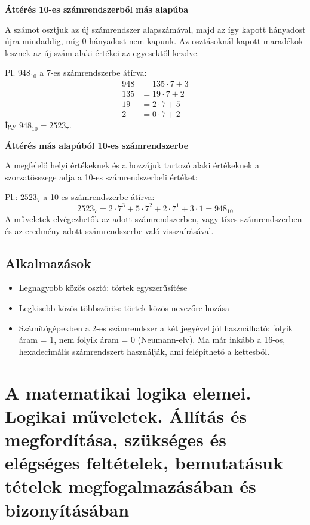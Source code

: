\documentclass[12pt,a4paper]{article}
\begin{document}
\vspace{30px}
\textbf{Áttérés 10-es számrendszerből más alapúba}

A számot osztjuk az új számrendszer alapszámával, majd az így kapott hányadost újra mindaddig, míg 0 hányadost nem kapunk. Az osztásoknál kapott maradékok lesznek az új szám alaki értékei az egyesektől kezdve.

Pl. $948_{10}$ a 7-es számrendszerbe átírva:
\begin{align*}
948 &= 135 \cdot 7 + 3 \\
135 &= 19 \cdot 7 + 2 \\
19 &= 2 \cdot 7 + 5 \\
2 &= 0 \cdot 7 + 2
\end{align*}
Így $948_{10} = 2523_7$.

\vspace{30px}
\textbf{Áttérés más alapúból 10-es számrendszerbe}

A megfelelő helyi értékeknek és a hozzájuk tartozó alaki értékeknek a szorzatösszege adja a 10-es számrendszerbeli értéket:

Pl.: $2523_7$ a 10-es számrendszerbe átírva:
$$2523_7 = 2 \cdot 7^3 + 5 \cdot 7^2 + 2 \cdot 7^1 + 3 \cdot 1 = 948_{10}$$
A műveletek elvégezhetők az adott számrendszerben, vagy tízes számrendszerben és az eredmény adott számrendszerbe való visszaírásával.

\subsection{Alkalmazások}
\begin{itemize}
\item Legnagyobb közös osztó: törtek egyszerűsítése
\item Legkisebb közös többszörös: törtek közös nevezőre hozása
\item Számítógépekben a 2-es számrendszer a két jegyével jól használható: folyik áram = 1, nem folyik áram = 0 (Neumann-elv). Ma már inkább a 16-os, hexadecimális számrendszert használják, ami felépíthető a kettesből.
\end{itemize}

\newpage


\section{A matematikai logika elemei. Logikai műveletek. Állítás és megfordítása, szükséges és elégséges feltételek, bemutatásuk tételek megfogalmazásában és bizonyításában}
\end{document}
